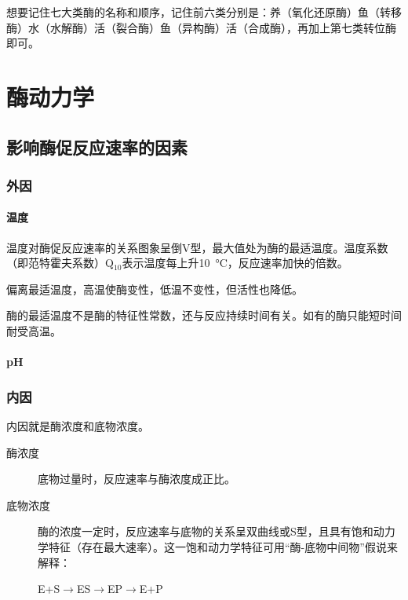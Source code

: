 \begin{qj}[：七大类酶]
	想要记住七大类酶的名称和顺序，记住前六类分别是：养（氧化还原酶）鱼（转移酶）水（水解酶）活（裂合酶）鱼（异构酶）活（合成酶），再加上第七类转位酶即可。
\end{qj}



\section{酶动力学}

\subsection{影响酶促反应速率的因素}

\subsubsection{外因}

\paragraph{温度}

温度对酶促反应速率的关系图象呈倒V型，最大值处为酶的最适温度。温度系数（即范特霍夫系数）Q$_{10}$表示温度每上升\SI{10}{\celsius}，反应速率加快的倍数。

偏离最适温度，高温使酶变性，低温不变性，但活性也降低。

酶的最适温度不是酶的特征性常数，还与反应持续时间有关。如有的酶只能短时间耐受高温。

\paragraph{pH}



\subsubsection{内因}

内因就是酶浓度和底物浓度。

\begin{description}
	\item[酶浓度] 底物过量时，反应速率与酶浓度成正比。
	\item[底物浓度] 酶的浓度一定时，反应速率与底物的关系呈双曲线或S型，且具有饱和动力学特征（存在最大速率）。这一饱和动力学特征可用“酶-底物中间物”假说来解释：
	\begin{center}
		E+S$\longrightarrow$ES$\longrightarrow$EP$\longrightarrow$E+P
	\end{center}
\end{description}

